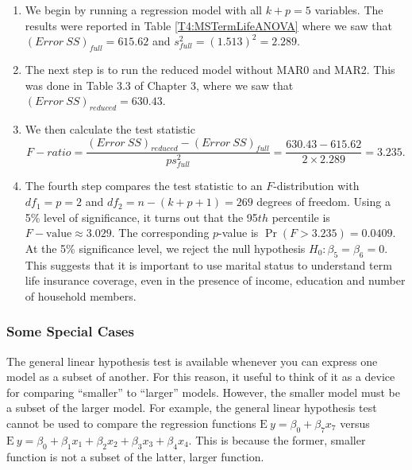 \begin{enumerate}
\item We begin by running a regression model
with all $k+p=5$ variables. The results were reported in Table
\ref{T4:MSTermLifeANOVA} where we saw that $(Error~SS)_{full} =
615.62$ and $s_{full}^{2} = (1.513)^2 = 2.289$.

\item The next step is to run the reduced model without MAR0 and MAR2.
This was done in Table 3.3 of Chapter 3, where we saw that
$(Error~SS)_{reduced} = 630.43.$

\item We then calculate the test statistic
\begin{equation*}
F-ratio=\frac{(Error~SS)_{reduced}-(Error~SS)_{full}}{ps_{full}^{2}}
= \frac{630.43 -615.62}{2 \times 2.289} = 3.235 .
\end{equation*}

\item The fourth step compares the test statistic to an $F$-distribution with
$df_1=p=2$ and $df_2 = n-(k+p+1) = 269$ degrees of freedom. Using a
5\% level of significance, it turns out that the 95$th$ percentile
is $F-\textrm{value} \approx 3.029$. The corresponding $p$-value is
$\Pr(F > 3.235) = 0.0409$. At the 5\% significance level, we reject
the null hypothesis $H_0:\beta_5=\beta_6=0$. This suggests that it
is important to use marital status to understand term life insurance
coverage, even in the presence of income, education and number of
household members.

\end{enumerate}

\linejed

\subsubsection*{Some Special Cases}

The general linear hypothesis test is available whenever you can
express one model as a subset of another. For this reason, it useful
to think of it as a device for comparing ``smaller'' to ``larger''
models. However, the smaller model must be a subset of the larger
model. For example, the general linear hypothesis test cannot be
used to compare the regression functions $\mathrm{ E~}y = \beta_0 +
\beta_7 x_7$ versus $\mathrm{E~}y = \beta_0 + \beta_1 x_1 + \beta_2
x_2 + \beta_3 x_3 + \beta_4 x_4$. This is because the former,
smaller function is not a subset of the latter, larger function.

